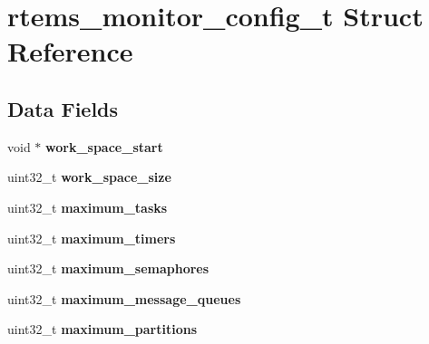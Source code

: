 \hypertarget{structrtems__monitor__config__t}{}\section{rtems\+\_\+monitor\+\_\+config\+\_\+t Struct Reference}
\label{structrtems__monitor__config__t}
\subsection*{Data Fields}
\begin{DoxyCompactItemize}
\item 
\mbox{\label{structrtems__monitor__config__t_a58e083ed9cbc4403c308b268861d0b21}} 
void $\ast$ {\bfseries work\+\_\+space\+\_\+start}
\item 
\mbox{\label{structrtems__monitor__config__t_acab67a3e3b7eb60cdd6957be1ed9aac9}} 
uint32\+\_\+t {\bfseries work\+\_\+space\+\_\+size}
\item 
\mbox{\label{structrtems__monitor__config__t_a52b5d9ed4e21231beae762ffcb5fcac1}} 
uint32\+\_\+t {\bfseries maximum\+\_\+tasks}
\item 
\mbox{\label{structrtems__monitor__config__t_ad3540d2cffcd1677cdf5184549cbebca}} 
uint32\+\_\+t {\bfseries maximum\+\_\+timers}
\item 
\mbox{\label{structrtems__monitor__config__t_a9f6a738b41bc61842f2dabae7c09bc90}} 
uint32\+\_\+t {\bfseries maximum\+\_\+semaphores}
\item 
\mbox{\label{structrtems__monitor__config__t_a2a4659c1506fb44b1cd123d369323a3d}} 
uint32\+\_\+t {\bfseries maximum\+\_\+message\+\_\+queues}
\item 
\mbox{\label{structrtems__monitor__config__t_aedd8f294bff87655b7dafee2d1a8bf81}} 
uint32\+\_\+t {\bfseries maximum\+\_\+partitions}
\item 
\mbox{\label{structrtems__monitor__config__t_a185a764e7e99278f9252aa32637193f9}} 

\end{DoxyCompactItemize}

